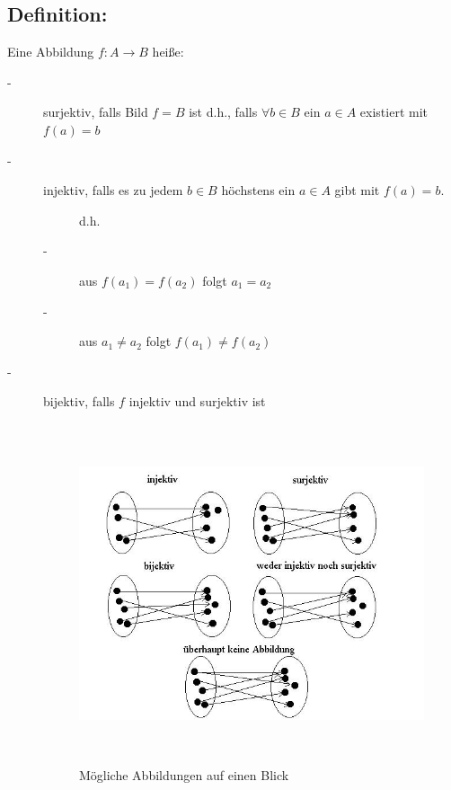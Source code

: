 \subsection{Definition:}
Eine Abbildung $f: A \rightarrow B$ heiße:

	\begin{description}
		\item[-] surjektiv, falls Bild $f = B$ ist d.h., falls $\forall b \in B$ ein $a \in A$ existiert mit $f(a)=b$


		\item[-] injektiv, falls es zu jedem $b \in B$ höchstens ein $a \in A$ gibt mit $f(a)=b$.
		\begin{description}
			\item[] d.h.
			\item[-]  aus $f(a_{1}) = f(a_{2})$ folgt $a_{1}=a_{2}$
			\item[-] aus $a_{1} \neq a_{2}$ folgt $f(a_{1}) \neq f(a_{2})$
		\end{description}
		
		\item[-] bijektiv, falls $f$ injektiv und surjektiv ist 
				\begin{figure} [H]
				\centering 
				\includegraphics[width=17cm, height=10cm]{mainmatter/chapter1/pics/abbildungen.jpg}
				\caption{Mögliche Abbildungen auf einen Blick} 
				\end{figure}
	\end{description}


%
%
%
